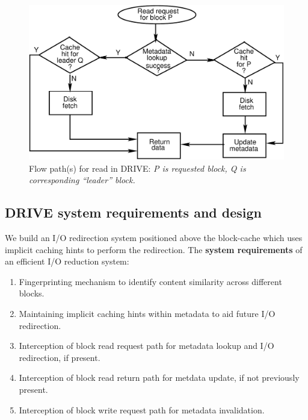 \begin{figure}
\begin{minipage}{0.55\textwidth}
    \includegraphics[scale=0.5]{confided-figures/main/dedup-working-readflowcomp.pdf}
    \caption{Flow path(s) for read in DRIVE: \textit{P is requested block, Q is corresponding ``leader'' block.}}
    \label{fig:confided-working(b)}
	\end{minipage}
\end{figure}
\vspace{-0.2in}


\subsection{DRIVE system requirements and design}
We build an I/O redirection system positioned above the block-cache which uses implicit caching
hints to perform the redirection.
The \textbf{system requirements} of an efficient I/O reduction system:
\begin{enumerate}
	\singlespacing
	\small
\item Fingerprinting mechanism to identify content similarity across different blocks.
\item Maintaining implicit caching hints within metadata to aid future I/O redirection.
\item Interception of block read request path for metadata lookup and I/O redirection, if present.
\item Interception of block read return path for metdata update, if not previously present.
\item Interception of block write request path for metadata invalidation.
\end{enumerate}

